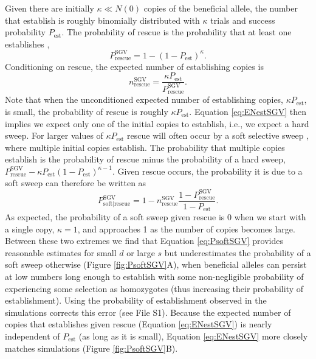 \documentclass[]{article}
\begin{document}
Given there are initially $\kappa\ll N(0)$ copies of the beneficial allele, the number that establish is roughly binomially distributed with $\kappa$ trials and success probability $P_\mathrm{est}$.
The probability of rescue is the probability that at least one establishes \citep[c.f., equation 2 in][]{orr2014population},
\begin{equation}
P_\mathrm{rescue}^\mathrm{SGV} = 1-(1-P_\mathrm{est})^\kappa.
\end{equation}
Conditioning on rescue, the expected number of establishing copies is
\begin{equation}\label{eq:ENestSGV}
n^\mathrm{SGV}_\mathrm{rescue} = \frac{\kappa P_\mathrm{est}}{P^\mathrm{SGV}_\mathrm{rescue}}.
\end{equation}
Note that when the unconditioned expected number of establishing copies, $\kappa P_\mathrm{est}$, is small, the probability of rescue is roughly $\kappa P_\mathrm{est}$.
Equation \ref{eq:ENestSGV} then implies we expect only one of the initial copies to establish, i.e., we expect a hard sweep.
For larger values of $\kappa P_\mathrm{est}$ rescue will often occur by a soft selective sweep \citep{hermisson2005soft}, where multiple initial copies establish.
The probability that multiple copies establish is the probability of rescue minus the probability of a hard sweep, $P^\mathrm{SGV}_\mathrm{rescue} - \kappa P_\mathrm{est} (1-P_\mathrm{est})^{\kappa-1}$.
Given rescue occurs, the probability it is due to a soft sweep can therefore be written as
\begin{equation}\label{eq:PsoftSGV}
P_{\mathrm{soft}|\mathrm{rescue}}^\mathrm{SGV} = 1 -n^\mathrm{SGV}_\mathrm{rescue} \frac{1-P_\mathrm{rescue}^\mathrm{SGV}}{1-P_\mathrm{est}}.
\end{equation}
As expected, the probability of a soft sweep given rescue is 0 when we start with a single copy, $\kappa=1$, and approaches 1 as the number of copies becomes large.
Between these two extremes we find that Equation \ref{eq:PsoftSGV} provides reasonable estimates for small $d$ or large $s$ but  underestimates the probability of a soft sweep otherwise (Figure \ref{fig:PsoftSGV}A), when beneficial alleles can persist at low numbers long enough to establish with some non-negligible probability of experiencing some selection as homozygotes (thus increasing their probability of establishment).
Using the probability of establishment observed in the simulations corrects this error (see File S1).
Because the expected number of copies that establishes given rescue (Equation \ref{eq:ENestSGV}) is nearly independent of $P_\mathrm{est}$ (as long as it is small), Equation \ref{eq:ENestSGV} more closely matches simulations (Figure \ref{fig:PsoftSGV}B).
\end{document}
